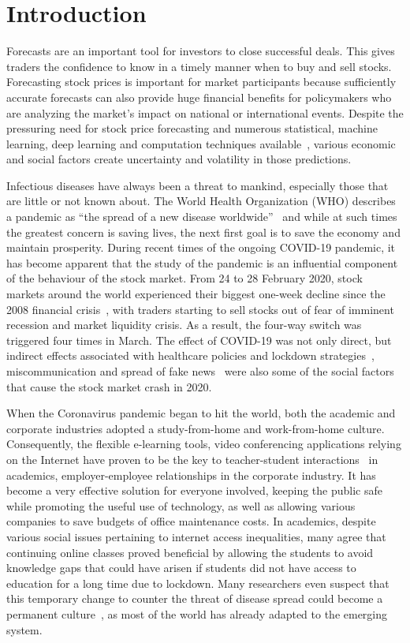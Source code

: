 \documentclass[11pt, a4paper]{article}
\begin{document}
\section{Introduction}
Forecasts are an important tool for investors to close successful deals. This gives traders the confidence to know in a timely manner when to buy and sell stocks. Forecasting stock prices is important for market participants because sufficiently accurate forecasts can also provide huge financial benefits for policymakers who are analyzing the market's impact on national or international events. Despite the pressuring need for stock price forecasting and numerous statistical, machine learning, deep learning and computation techniques available~\cite{wiki-stock}, various economic and social factors create uncertainty and volatility in those predictions. 

Infectious diseases have always been a threat to mankind, especially those that are little or not known about. The World Health Organization (WHO) describes a pandemic as ``the spread of a new disease worldwide''~\cite{who-pandemic-defn} and while at such times the greatest concern is saving lives, the next first goal is to save the economy and maintain prosperity. During recent times of the ongoing COVID-19 pandemic, it has become apparent that the study of the pandemic is an influential component of the behaviour of the stock market. From 24 to 28 February 2020, stock markets around the world experienced their biggest one-week decline since the 2008 financial crisis~\cite{wiki-stock-crash}, with traders starting to sell stocks out of fear of imminent recession and market liquidity crisis. As a result, the four-way switch was triggered four times in March. The effect of COVID-19 was not only direct, but indirect effects associated with healthcare policies and lockdown strategies~\cite{guru2021covid}, miscommunication and spread of fake news~\cite{salisu2020predicting} were also some of the social factors that cause the stock market crash in 2020.

When the Coronavirus pandemic began to hit the world, both the academic and corporate industries adopted a study-from-home and work-from-home culture. Consequently, the flexible e-learning tools, video conferencing applications relying on the Internet have proven to be the key to teacher-student interactions~\cite{chen2020impact} in academics, employer-employee relationships in the corporate industry. It has become a very effective solution for everyone involved, keeping the public safe while promoting the useful use of technology, as well as allowing various companies to save budgets of office maintenance costs. In academics, despite various social issues pertaining to internet access inequalities, many agree that continuing online classes proved beneficial by allowing the students to avoid knowledge gaps that could have arisen if students did not have access to education for a long time due to lockdown. Many researchers even suspect that this temporary change to counter the threat of disease spread could become a permanent culture~\cite{bick2020work}, as most of the world has already adapted to the emerging system. 
\end{document}
